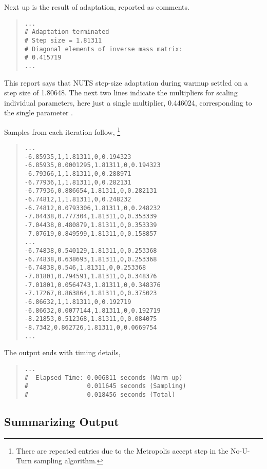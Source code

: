 Next up is the result of adaptation, reported as comments.
%
\begin{quote}
\begin{Verbatim}[fontsize=\small]
...
# Adaptation terminated
# Step size = 1.81311
# Diagonal elements of inverse mass matrix:
# 0.415719
...
\end{Verbatim}
\end{quote}
%
This report says that NUTS step-size adaptation during warmup
settled on a step size of 1.80648.  The next two lines
indicate the multipliers for scaling individual parameters, here
just a single multiplier, 0.446024, corresponding to the single
parameter .

Samples from each iteration follow,%
%
\footnote{There are repeated entries due to the Metropolis accept step
in the No-U-Turn sampling algorithm.}
%
%
\begin{quote}
\begin{Verbatim}[fontsize=\small]
...
-6.85935,1,1.81311,0,0.194323
-6.85935,0.0001295,1.81311,0,0.194323
-6.79366,1,1.81311,0,0.288971
-6.77936,1,1.81311,0,0.282131
-6.77936,0.886654,1.81311,0,0.282131
-6.74812,1,1.81311,0,0.248232
-6.74812,0.0793306,1.81311,0,0.248232
-7.04438,0.777304,1.81311,0,0.353339
-7.04438,0.480879,1.81311,0,0.353339
-7.07619,0.849599,1.81311,0,0.158857
...
-6.74838,0.540129,1.81311,0,0.253368
-6.74838,0.638693,1.81311,0,0.253368
-6.74838,0.546,1.81311,0,0.253368
-7.01801,0.794591,1.81311,0,0.348376
-7.01801,0.0564743,1.81311,0,0.348376
-7.17267,0.863864,1.81311,0,0.375023
-6.86632,1,1.81311,0,0.192719
-6.86632,0.0077144,1.81311,0,0.192719
-8.21853,0.512368,1.81311,0,0.084075
-8.7342,0.862726,1.81311,0,0.0669754
...
\end{Verbatim}
\end{quote}
%

The output ends with timing details,%
\begin{quote}
\begin{Verbatim}[fontsize=\small]
...
#  Elapsed Time: 0.006811 seconds (Warm-up)
#                0.011645 seconds (Sampling)
#                0.018456 seconds (Total)
\end{Verbatim}
\end{quote}

\subsection{Summarizing Output}

